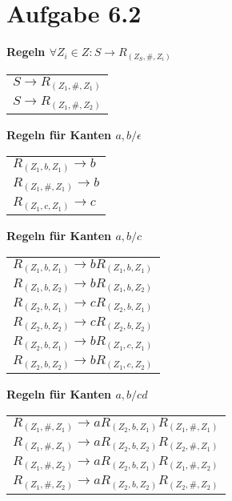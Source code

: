 \documentclass{article}
\begin{document}
\section*{Aufgabe 6.2}
\scriptsize
\textbf{Regeln $\forall Z_i \in Z: S \rightarrow R_{(Z_S,\#,Z_i)}$\\}
\begin{tabular}{l}
$S \rightarrow R_{(Z_1,\#,Z_1)}$ \\
$S \rightarrow R_{(Z_1,\#,Z_2)}$ \\
\end{tabular}

\textbf{Regeln für Kanten $a,b/\epsilon$\\}
\begin{tabular}{l}
$R_{(Z_1,b,Z_1)} \rightarrow b$ \\
$R_{(Z_1,\#,Z_1)} \rightarrow b$ \\
$R_{(Z_1,c,Z_1)} \rightarrow c$ \\
\end{tabular}

\textbf{Regeln für Kanten $a,b/c$\\}
\begin{tabular}{l}
$R_{(Z_1,b,Z_1)} \rightarrow bR_{(Z_1,b,Z_1)}$ \\
$R_{(Z_1,b,Z_2)} \rightarrow bR_{(Z_1,b,Z_2)}$ \\
$R_{(Z_2,b,Z_1)} \rightarrow cR_{(Z_2,b,Z_1)}$ \\
$R_{(Z_2,b,Z_2)} \rightarrow cR_{(Z_2,b,Z_2)}$ \\
$R_{(Z_2,b,Z_1)} \rightarrow bR_{(Z_1,c,Z_1)}$ \\
$R_{(Z_2,b,Z_2)} \rightarrow bR_{(Z_1,c,Z_2)}$ \\
\end{tabular}

\textbf{Regeln für Kanten $a,b/cd$\\}
\begin{tabular}{l}
$R_{(Z_1,\#,Z_1)} \rightarrow aR_{(Z_2,b,Z_1)}R_{(Z_1,\#,Z_1)}$ \\
$R_{(Z_1,\#,Z_1)} \rightarrow aR_{(Z_2,b,Z_2)}R_{(Z_2,\#,Z_1)}$ \\
$R_{(Z_1,\#,Z_2)} \rightarrow aR_{(Z_2,b,Z_1)}R_{(Z_1,\#,Z_2)}$ \\
$R_{(Z_1,\#,Z_2)} \rightarrow aR_{(Z_2,b,Z_2)}R_{(Z_2,\#,Z_2)}$ \\
\end{tabular}
\end{document}
